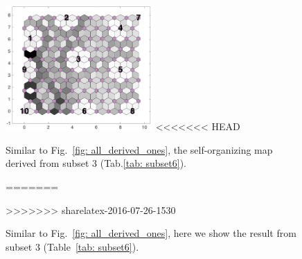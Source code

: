 \begin{figure}
        \centering
        \includegraphics[width=0.5\textwidth]{../../images0.01/M31/2D/image_subsets/subset6_dist_with_hits_t.png}
<<<<<<< HEAD
    \caption{Similar to Fig.~\ref{fig: all_derived_ones}, the self-organizing map derived from subset 3 (Tab.\ref{tab: subset6}).}
=======
    \caption{Similar to Fig.~\ref{fig: all_derived_ones}, here we show the result from subset 3 (Table~\ref{tab: subset6}).}
>>>>>>> sharelatex-2016-07-26-1530
    \label{fig: subset6}
\end{figure}
